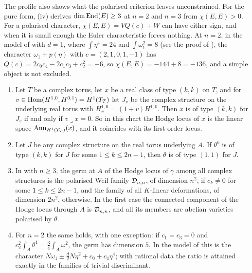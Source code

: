 The profile also shows what the polarised criterion leaves unconstrained. For
the pure form, (iv) derives $\dim\operatorname{End}(E)\ge3$ at $n=2$ and
$n=3$ from $\chi(E,E)>0$. For a polarised character, $\chi(E,E)=VQ(c)+W$ can
have either sign, and when it is small enough the Euler characteristic forces
nothing. At $n=2$, in the model of  with $d=1$, where
$\int\eta^{4}=24$ and $\int\omega_{1}^{2}=8$ (see the proof of
), the character $\omega_{1}+p(\eta)$ with
$c=(2,1,0,1,-1)$ has $Q(c)=2c_{0}c_{4}-2c_{1}c_{3}+c_{2}^{2}=-6$, so
$\chi(E,E)=-144+8=-136$, and a simple object is not excluded.

\begin{proposition}
\label{prop:p2primelocus}
\begin{enumerate}[label=\textup{(\roman*)},leftmargin=2.6em,itemsep=2pt]
\item Let $T$ be a complex torus, let $x$ be a real class of type $(k,k)$ on
  $T$, and for $v\in\operatorname{Hom}(H^{1,0},H^{0,1})=H^{1}(T_{T})$ let $J_{v}$ be the
  complex structure on the underlying real torus with $H^{1,0}_{v}=(1+v)H^{1,0}$.
  Then $x$ is of type $(k,k)$ for $J_{v}$ if and only if $v\lrcorner x=0$. So
  in this chart the Hodge locus of $x$ is the linear space
  $\operatorname{Ann}_{H^{1}(T_{T})}(x)$, and it coincides with its first-order locus.
\item Let $J$ be any complex structure on the real torus underlying $A$. If
  $\theta^{k}$ is of type $(k,k)$ for $J$ for some $1\le k\le2n-1$, then
  $\theta$ is of type $(1,1)$ for $J$.
\item In  with $n\ge3$, the germ at $A$ of the Hodge locus
  of $\gamma$ among all complex structures is the polarised Weil family
  $\mathcal{D}_{n,n}$, of dimension $n^{2}$, if $c_{k}\ne0$ for some $1\le k\le2n-1$,
  and the family of all $K$-linear deformations, of dimension $2n^{2}$,
  otherwise. In the first case the connected component of the Hodge locus
  through $A$ is $\mathcal{D}_{n,n}$, and all its members are abelian varieties
  polarised by $\theta$.
\item For $n=2$ the same holds, with one exception: if $c_{1}=c_{3}=0$ and
  $c_{2}^{2}\int_{A}\theta^{4}=\tfrac34\int_{A}\omega^{2}$, the germ has
  dimension $5$. In the model of  this is
  the character $N\omega_{1}\pm\tfrac{d}{2}N\eta^{2}+c_{0}+c_{4}\eta^{4}$;
  with rational data the ratio is attained exactly in the families of trivial
  discriminant.
\end{enumerate}
\end{proposition}

